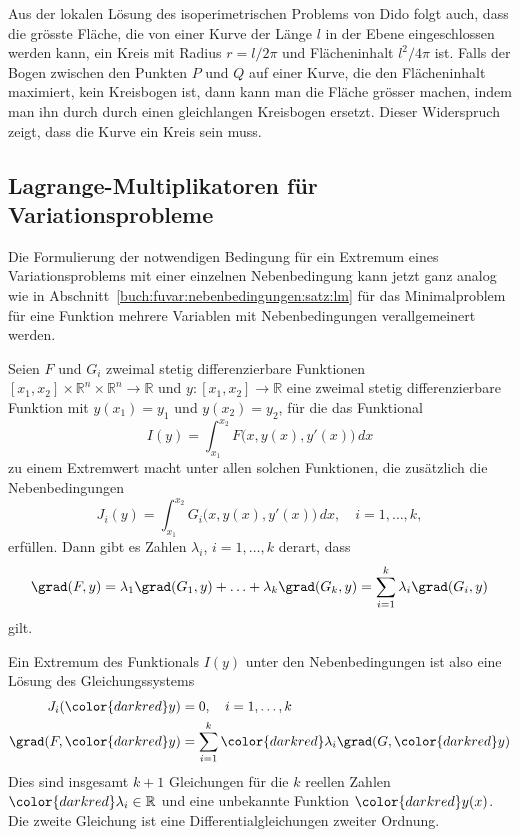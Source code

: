 Aus der lokalen Lösung des isoperimetrischen Problems von Dido
folgt auch, dass die grösste Fläche, die von einer Kurve der Länge
$l$ in der Ebene eingeschlossen werden kann, ein Kreis mit Radius
$r=l/2\pi$ und Flächeninhalt $l^2/4\pi$ ist.
Falls der Bogen zwischen den Punkten $P$ und $Q$ auf einer Kurve, die
den Flächeninhalt maximiert, kein Kreisbogen ist, dann kann man die
Fläche grösser machen, indem man ihn durch durch einen gleichlangen
Kreisbogen ersetzt.
Dieser Widerspruch zeigt, dass die Kurve ein Kreis sein muss.

%
%
\subsection{Lagrange-Multiplikatoren für Variationsprobleme
\label{buch:nebenbedingungen:lagrangemult:subsection:lagrangemult}}
Die Formulierung der notwendigen Bedingung für ein Extremum eines
Variationsproblems mit einer einzelnen Nebenbedingung kann jetzt
ganz analog wie in Abschnitt~\ref{buch:fuvar:nebenbedingungen:satz:lm}
für das Minimalproblem für eine
Funktion mehrere Variablen mit Nebenbedingungen verallgemeinert
werden.

\begin{satz}
Seien $F$ und $G_i$ zweimal stetig differenzierbare Funktionen
$[x_1,x_2]\times\mathbb{R}^n\times\mathbb{R}^n\to\mathbb{R}$
und $y\colon[x_1,x_2]\to\mathbb{R}$ eine zweimal stetig
differenzierbare Funktion mit $y(x_1)=y_1$ und $y(x_2)=y_2$, für die
das Funktional
\[
I(y)
=
\int_{x_1}^{x_2} F\bigl(x,y(x),y'(x)\bigr)\,dx
\]
zu einem Extremwert macht unter allen solchen Funktionen, die zusätzlich
die Nebenbedingungen
\[
J_i(y)
=
\int_{x_1}^{x_2}
G_i\bigl(x,y(x),y'(x)\bigr)\,dx,
\quad
i=1,\dots,k,
\]
erfüllen.
Dann gibt es Zahlen $\lambda_i$, $i=1,\dots,k$ derart, dass
\[
\grad(F,y)
=
\lambda_1\grad(G_1,y)+\ldots+\lambda_k\grad(G_k,y)
=
\sum_{i=1}^k \lambda_i \grad(G_i,y)
\]
gilt.
\end{satz}

Ein Extremum des Funktionals $I(y)$ unter den Nebenbedingungen ist
also eine Lösung des Gleichungssystems
\begin{align}
J_i({\color{darkred}y})&=0,\quad i=1,\dots,k\\
\grad(F,{\color{darkred}y})
&=\sum_{i=1}^k {\color{darkred}\lambda_i} \grad(G,{\color{darkred}y})
\end{align}
Dies sind insgesamt $k+1$ Gleichungen für die $k$ reellen Zahlen
${\color{darkred}\lambda_i}\in\mathbb{R}$ und eine unbekannte Funktion
${\color{darkred}y(x)}$.
Die zweite Gleichung ist eine Differentialgleichungen zweiter Ordnung.



